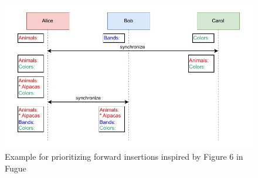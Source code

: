 \begin{figure}
  \centering
  \includegraphics[width=\textwidth]{figures/forward-more-important-than-backward.drawio.pdf}
  \caption{Example for prioritizing forward insertions inspired by Figure 6 in Fugue \protect\cite{2023-weidner-minimizing-interleaving}}
  \label{fig:forward-more-important-than-backward}
\end{figure}

\clearpage

